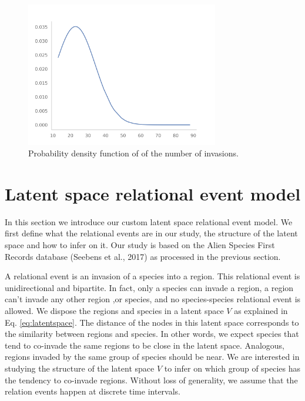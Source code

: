 \documentclass[mscthesis]{usiinfthesis}
\begin{document}
\begin{figure}[H]
    \centering
    \includegraphics[width=0.75\textwidth]{species_region_invasion_filtering.png}
    \caption{Probability density function of of the number of invasions.}
    \label{fig:pdf_invasion_filtered}
\end{figure}


\section{Latent space relational event model}

In this section we introduce our custom latent space relational event model. We first define what the relational events are in our study, the structure of the latent space and how to infer on it. Our study is based on the Alien Species First Records database (Seebens et al., 2017) as processed in the previous section.

A relational event is an invasion of a species into a region. This relational event is unidirectional and bipartite. In fact, only a species can invade a region, a region can't invade any other region ,or species, and no species-species relational event is allowed. We dispose the regions and species in a latent space $V$ as explained in Eq. \ref{eq:latentspace}. The distance of the nodes in this latent space corresponds to the similarity between regions and species. In other words, we expect species that tend to co-invade the same regions to be close in the latent space. Analogous, regions invaded by the same group of species should be near. We are interested in studying the structure of the latent space $V$ to infer on which group of species has the tendency to co-invade regions. Without loss of generality, we assume that the relation events happen at discrete time intervals.
\end{document}
